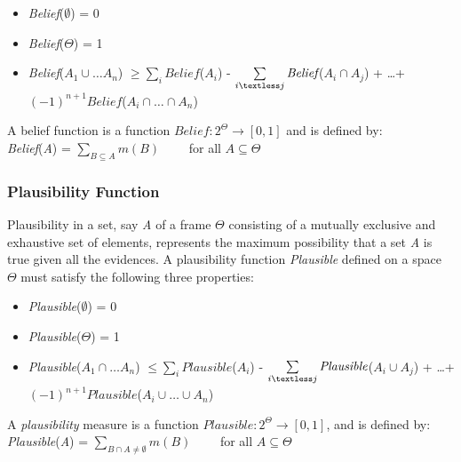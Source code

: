 \documentclass[11pt]{article}
\begin{document}
\begin{itemize}
	\item[]\textit{Belief}($\emptyset$) = 0
	\item[]\textit{Belief}($\Theta$) = 1
	\item[]\small\textit{Belief}($A_1 \cup \ldots A_n$)
	$\geq \sum\limits_i\textit{Belief}$($A_i$) - $\sum\limits_{i \textless
	j}\textit{Belief}$($A_i \cap A_j$) + \ldots +\\
	$(-1)^{n+1}\textit{Belief}$($A_i \cap \ldots \cap A_n$)
\end{itemize}

\noindent A belief function is a function $Belief:2^\Theta\rightarrow[0,1]$ and
is defined by:\\

\textit{Belief}(\textit{A}) = $\sum\limits_{B \subseteq A}m(B)\qquad$ for all $A
\subseteq \Theta$\\

\subsubsection{Plausibility Function}

Plausibility in a set, say \textit{A} of a frame $\Theta$ consisting of a
mutually exclusive and exhaustive set of elements, represents the maximum
possibility that a set \textit{A} is true given all the evidences. A
plausibility function \textit{Plausible} defined on a space $\Theta$ must satisfy the
following three properties:

\begin{itemize}
	\item[]\textit{Plausible}($\emptyset$) = 0
	\item[]\textit{Plausible}($\Theta$) = 1
	\item[]\small\textit{Plausible}($A_1 \cap \ldots A_n$)
	$\leq \sum\limits_i\textit{Plausible}$($A_i$) - $\sum\limits_{i \textless
	j}\textit{Plausible}$($A_i \cup A_j$) + \ldots +\\
	$(-1)^{n+1}\textit{Plausible}$($A_i \cup \ldots \cup A_n$)
\end{itemize}

A \textit{plausibility} measure is a function
$Plausible:2^\Theta\rightarrow[0,1]$, and is defined by:\\

\textit{Plausible}(\textit{A}) = $\sum\limits_{B \cap A \neq
\emptyset}m(B)\qquad$ for all $A \subseteq \Theta$\\
\end{document}
